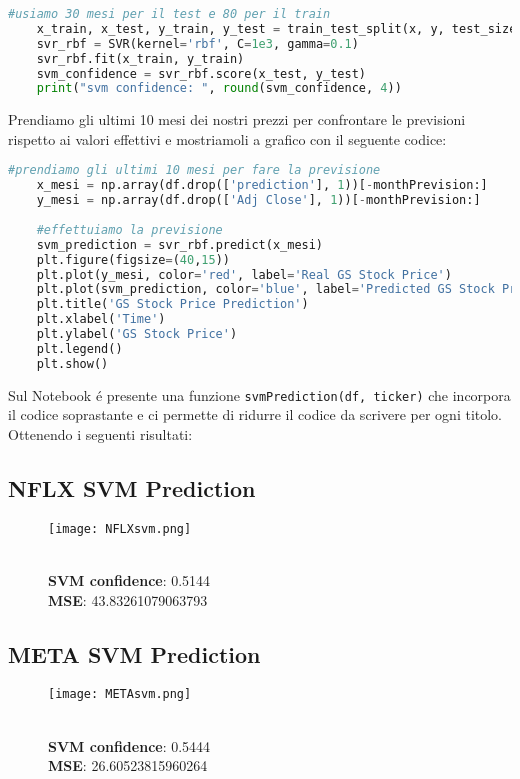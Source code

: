 \documentclass{report}
\begin{document}
\begin{lstlisting}[language=python]
    #usiamo 30 mesi per il test e 80 per il train
    x_train, x_test, y_train, y_test = train_test_split(x, y, test_size=30, train_size=80)
    svr_rbf = SVR(kernel='rbf', C=1e3, gamma=0.1)
    svr_rbf.fit(x_train, y_train)
    svm_confidence = svr_rbf.score(x_test, y_test)
    print("svm confidence: ", round(svm_confidence, 4))
\end{lstlisting}

Prendiamo gli ultimi 10 mesi dei nostri prezzi per confrontare le previsioni rispetto ai valori effettivi e mostriamoli a grafico con il seguente codice:

\begin{lstlisting}[language=python]
    #prendiamo gli ultimi 10 mesi per fare la previsione
    x_mesi = np.array(df.drop(['prediction'], 1))[-monthPrevision:]
    y_mesi = np.array(df.drop(['Adj Close'], 1))[-monthPrevision:]
    
    #effettuiamo la previsione
    svm_prediction = svr_rbf.predict(x_mesi)
    plt.figure(figsize=(40,15))
    plt.plot(y_mesi, color='red', label='Real GS Stock Price')
    plt.plot(svm_prediction, color='blue', label='Predicted GS Stock Price')
    plt.title('GS Stock Price Prediction')
    plt.xlabel('Time')
    plt.ylabel('GS Stock Price')
    plt.legend()
    plt.show()
\end{lstlisting}
Sul Notebook é presente una funzione \lstinline{svmPrediction(df, ticker)} che incorpora il codice soprastante e ci permette di ridurre il codice da scrivere per ogni titolo. Ottenendo i seguenti risultati:

\subsection{NFLX SVM Prediction}
\begin{figure}[h]
    \centering
    \texttt{[image: NFLXsvm.png]}
    \caption{\\ \textbf{SVM confidence}:  0.5144 \\ \textbf{MSE}:  43.83261079063793}
\end{figure}

\subsection{META SVM Prediction}

\begin{figure}[h]
    \centering
    \texttt{[image: METAsvm.png]}
    \caption{\\ \textbf{SVM confidence}:  0.5444 \\ \textbf{MSE}:  26.60523815960264}
\end{figure}
\end{document}
